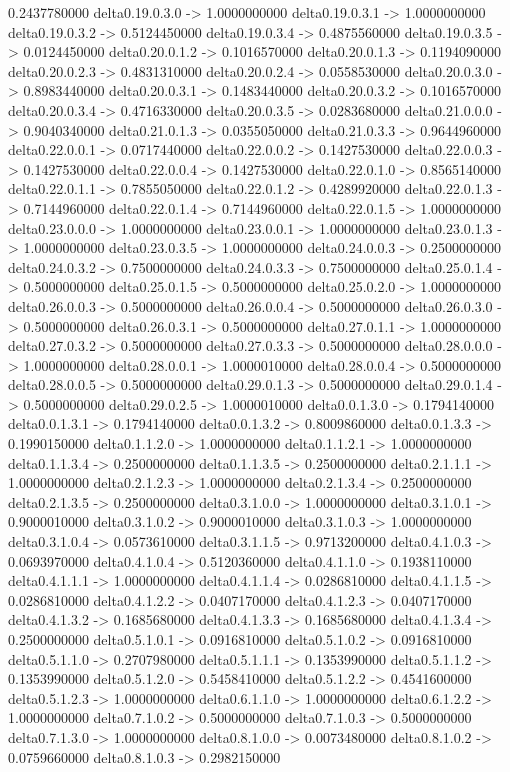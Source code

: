 0.2437780000    delta0.19.0.3.0 -> 1.0000000000    delta0.19.0.3.1 -> 1.0000000000    delta0.19.0.3.2 -> 0.5124450000    delta0.19.0.3.4 -> 0.4875560000    delta0.19.0.3.5 -> 0.0124450000    delta0.20.0.1.2 -> 0.1016570000    delta0.20.0.1.3 -> 0.1194090000    delta0.20.0.2.3 -> 0.4831310000    delta0.20.0.2.4 -> 0.0558530000    delta0.20.0.3.0 -> 0.8983440000    delta0.20.0.3.1 -> 0.1483440000    delta0.20.0.3.2 -> 0.1016570000    delta0.20.0.3.4 -> 0.4716330000    delta0.20.0.3.5 -> 0.0283680000    delta0.21.0.0.0 -> 0.9040340000    delta0.21.0.1.3 -> 0.0355050000    delta0.21.0.3.3 -> 0.9644960000    delta0.22.0.0.1 -> 0.0717440000    delta0.22.0.0.2 -> 0.1427530000    delta0.22.0.0.3 -> 0.1427530000    delta0.22.0.0.4 -> 0.1427530000    delta0.22.0.1.0 -> 0.8565140000    delta0.22.0.1.1 -> 0.7855050000    delta0.22.0.1.2 -> 0.4289920000    delta0.22.0.1.3 -> 0.7144960000    delta0.22.0.1.4 -> 0.7144960000    delta0.22.0.1.5 -> 1.0000000000    delta0.23.0.0.0 -> 1.0000000000    delta0.23.0.0.1 -> 1.0000000000    delta0.23.0.1.3 -> 1.0000000000    delta0.23.0.3.5 -> 1.0000000000    delta0.24.0.0.3 -> 0.2500000000    delta0.24.0.3.2 -> 0.7500000000    delta0.24.0.3.3 -> 0.7500000000    delta0.25.0.1.4 -> 0.5000000000    delta0.25.0.1.5 -> 0.5000000000    delta0.25.0.2.0 -> 1.0000000000    delta0.26.0.0.3 -> 0.5000000000    delta0.26.0.0.4 -> 0.5000000000    delta0.26.0.3.0 -> 0.5000000000    delta0.26.0.3.1 -> 0.5000000000    delta0.27.0.1.1 -> 1.0000000000    delta0.27.0.3.2 -> 0.5000000000    delta0.27.0.3.3 -> 0.5000000000    delta0.28.0.0.0 -> 1.0000000000    delta0.28.0.0.1 -> 1.0000010000    delta0.28.0.0.4 -> 0.5000000000    delta0.28.0.0.5 -> 0.5000000000    delta0.29.0.1.3 -> 0.5000000000    delta0.29.0.1.4 -> 0.5000000000    delta0.29.0.2.5 -> 1.0000010000    delta0.0.1.3.0 -> 0.1794140000    delta0.0.1.3.1 -> 0.1794140000    delta0.0.1.3.2 -> 0.8009860000    delta0.0.1.3.3 -> 0.1990150000    delta0.1.1.2.0 -> 1.0000000000    delta0.1.1.2.1 -> 1.0000000000    delta0.1.1.3.4 -> 0.2500000000    delta0.1.1.3.5 -> 0.2500000000    delta0.2.1.1.1 -> 1.0000000000    delta0.2.1.2.3 -> 1.0000000000    delta0.2.1.3.4 -> 0.2500000000    delta0.2.1.3.5 -> 0.2500000000    delta0.3.1.0.0 -> 1.0000000000    delta0.3.1.0.1 -> 0.9000010000    delta0.3.1.0.2 -> 0.9000010000    delta0.3.1.0.3 -> 1.0000000000    delta0.3.1.0.4 -> 0.0573610000    delta0.3.1.1.5 -> 0.9713200000    delta0.4.1.0.3 -> 0.0693970000    delta0.4.1.0.4 -> 0.5120360000    delta0.4.1.1.0 -> 0.1938110000    delta0.4.1.1.1 -> 1.0000000000    delta0.4.1.1.4 -> 0.0286810000    delta0.4.1.1.5 -> 0.0286810000    delta0.4.1.2.2 -> 0.0407170000    delta0.4.1.2.3 -> 0.0407170000    delta0.4.1.3.2 -> 0.1685680000    delta0.4.1.3.3 -> 0.1685680000    delta0.4.1.3.4 -> 0.2500000000    delta0.5.1.0.1 -> 0.0916810000    delta0.5.1.0.2 -> 0.0916810000    delta0.5.1.1.0 -> 0.2707980000    delta0.5.1.1.1 -> 0.1353990000    delta0.5.1.1.2 -> 0.1353990000    delta0.5.1.2.0 -> 0.5458410000    delta0.5.1.2.2 -> 0.4541600000    delta0.5.1.2.3 -> 1.0000000000    delta0.6.1.1.0 -> 1.0000000000    delta0.6.1.2.2 -> 1.0000000000    delta0.7.1.0.2 -> 0.5000000000    delta0.7.1.0.3 -> 0.5000000000    delta0.7.1.3.0 -> 1.0000000000    delta0.8.1.0.0 -> 0.0073480000    delta0.8.1.0.2 -> 0.0759660000    delta0.8.1.0.3 -> 0.2982150000    